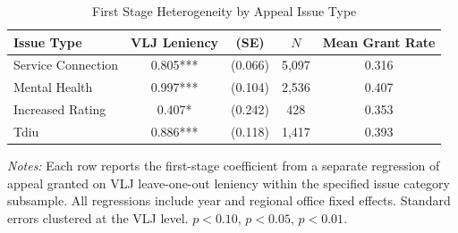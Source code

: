 
\begin{table}[H]
\centering
\caption{First Stage Heterogeneity by Appeal Issue Type}
\begin{threeparttable}
\begin{tabular}{lcccc}
\toprule
Issue Type & VLJ Leniency & (SE) & $N$ & Mean Grant Rate \\
\midrule
Service Connection & 0.805*** & (0.066) & 5,097 & 0.316 \\
Mental Health & 0.997*** & (0.104) & 2,536 & 0.407 \\
Increased Rating & 0.407* & (0.242) & 428 & 0.353 \\
Tdiu & 0.886*** & (0.118) & 1,417 & 0.393 \\
\bottomrule
\end{tabular}
\begin{tablenotes}[flushleft]
\small
\item \textit{Notes:} Each row reports the first-stage coefficient from a separate regression of appeal granted on VLJ leave-one-out leniency within the specified issue category subsample. All regressions include year and regional office fixed effects. Standard errors clustered at the VLJ level. \sym{*} $p<0.10$, \sym{**} $p<0.05$, \sym{***} $p<0.01$.
\end{tablenotes}
\end{threeparttable}
\label{tab:heterogeneity}
\end{table}
